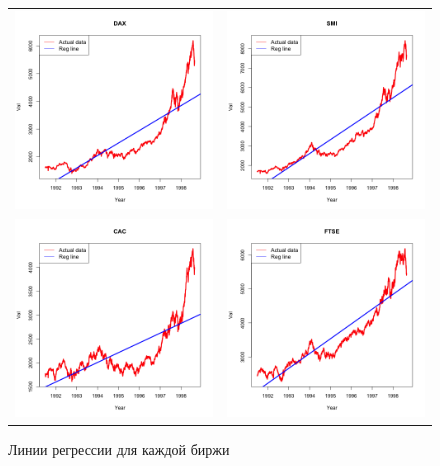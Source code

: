 \documentclass[]{article}
\numberwithin{equation}{section}
\begin{document}
    \begin{figure}[H]
        \centering
        \begin{tabular}{c c}
            \includegraphics[width = 0.4\linewidth]{data/stockmark_reg_DAX.png} & \includegraphics[width = 0.4\linewidth]{data/stockmark_reg_SMI.png} \\
            \includegraphics[width = 0.4\linewidth]{data/stockmark_reg_CAC.png} & \includegraphics[width = 0.4\linewidth]{data/stockmark_reg_FTSE.png}
        \end{tabular}
        \vspace{-0.5cm}
        \caption{Линии регрессии для каждой биржи}
    \end{figure}
\end{document}
